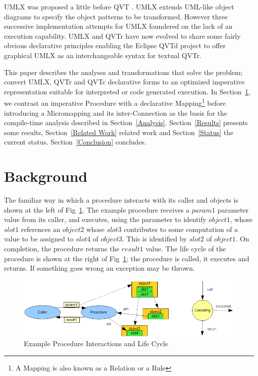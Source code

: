 \documentclass{llncs}
\begin{document}
UMLX \cite{UMLX} was proposed a little before QVT \cite{QVT-1.0}. UMLX extends UML-like object diagrams to specify the object patterns to be transformed. However three successive implementation attempts for UMLX foundered on the lack of an execution capability. UMLX and QVTr have now evolved to share some fairly obvious declarative principles enabling the Eclipse QVTd project to offer graphical UMLX as an interchangeable syntax for textual QVTr.

This paper describes the analyses and transformations that solve the problem; convert UMLX, QVTr and QVTc declarative forms to an optimized imperative representation suitable for interpreted or code generated execution. In Section~\ref{Background}, we contrast an imperative Procedure with a declarative Mapping\footnote{A Mapping is also known as a Relation or a Rule} before introducing a Micromapping and its inter-Connection as the basis for the compile-time analysis described in Section~\ref{Analysis}. Section~\ref{Results} presents some results, Section~\ref{Related Work} related work and Section~\ref{Status} the current status. Section~\ref{Conclusion} concludes.

\section{Background}\label{Background}

The familiar way in which a procedure interacts with its caller and objects is shown at the left of Fig~\ref{fig:FunctionContext}. The example procedure receives a $param1$ parameter value from its caller, and executes, using the parameter to identify $object1$, whose $slot1$ references an $object2$ whose $slot3$ contributes to some computation of a value to be assigned to $slot4$ of $object3$. This is identified by $slot2$ of $object1$. On completion, the procedure returns the $result1$ value. The life cycle of the procedure is shown at the right of Fig~\ref{fig:FunctionContext}; the procedure is called, it executes and returns. If something goes wrong an exception may be thrown.

\begin{figure}
  \begin{center}
    \includegraphics[width=4.5in]{FunctionContext.png}
  \end{center}
  \caption{Example Procedure Interactions and Life Cycle}
  \label{fig:FunctionContext}
\end{figure}
\end{document}
